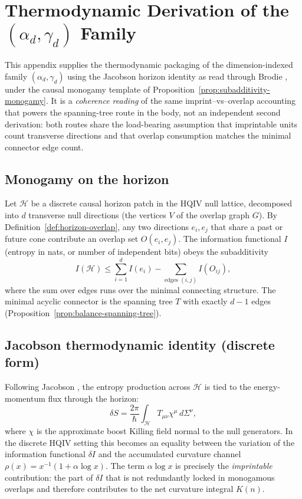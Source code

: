 \documentclass[11pt]{amsart}
\begin{document}
\appendix
\section[Thermodynamic derivation of the imprint family]{Thermodynamic Derivation of the \texorpdfstring{\((\alpha_d,\gamma_d)\)}{(alpha\_d, gamma\_d)} Family}
\label{sec:thermo-derivation}

This appendix supplies the thermodynamic packaging of the dimension-indexed family \((\alpha_d,\gamma_d)\) using the Jacobson horizon identity as read through Brodie \cite{brodie2026}, under the causal monogamy template of Proposition~\ref{prop:subadditivity-monogamy}. It is a \emph{coherence reading} of the same imprint--vs--overlap accounting that powers the spanning-tree route in the body, not an independent second derivation: both routes share the load-bearing assumption that imprintable units count transverse directions and that overlap consumption matches the minimal connector edge count.

\subsection{Monogamy on the horizon}

Let \(\mathcal{H}\) be a discrete causal horizon patch in the HQIV null lattice, decomposed into \(d\) transverse null directions (the vertices \(V\) of the overlap graph \(G\)). By Definition~\ref{def:horizon-overlap}, any two directions \(e_i,e_j\) that share a past or future cone contribute an overlap set \(O(e_i,e_j)\). The information functional \(I\) (entropy in nats, or number of independent bits) obeys the subadditivity
\[
I(\mathcal{H})\le\sum_{i=1}^d I(e_i)-\sum_{\text{edges }(i,j)}I(O_{ij}),
\]
where the sum over edges runs over the minimal connecting structure. The minimal acyclic connector is the spanning tree \(T\) with exactly \(d-1\) edges (Proposition~\ref{prop:balance-spanning-tree}).

\subsection{Jacobson thermodynamic identity (discrete form)}

Following Jacobson \cite{Jacobson1995}, the entropy production across \(\mathcal{H}\) is tied to the energy-momentum flux through the horizon:
\[
\delta S=\frac{2\pi}{\hbar}\int_{\mathcal{H}}T_{\mu\nu}\chi^\mu\,d\Sigma^\nu,
\]
where \(\chi\) is the approximate boost Killing field normal to the null generators. In the discrete HQIV setting this becomes an equality between the variation of the information functional \(\delta I\) and the accumulated curvature channel \(\rho(x)=x^{-1}(1+\alpha\log x)\). The term \(\alpha\log x\) is precisely the \emph{imprintable} contribution: the part of \(\delta I\) that is not redundantly locked in monogamous overlaps and therefore contributes to the net curvature integral \(K(n)\).
\end{document}
